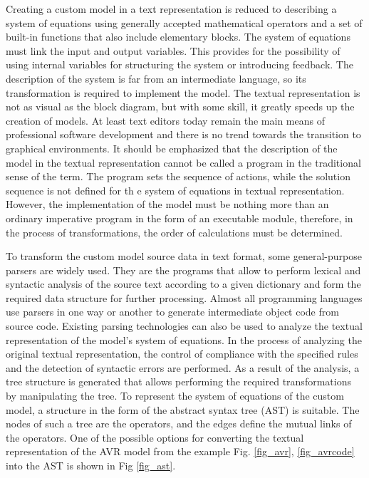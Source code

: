 \documentclass[lettersize,journal]{IEEEtran}
\begin{document}
Creating a custom model in a text representation is reduced to describing a system of equations using generally accepted
mathematical operators and a set of built-in functions that also include elementary blocks. The system of equations must 
link the input and output variables. This provides for the possibility of using internal variables for structuring the 
system or introducing feedback. The description of the system is far from an intermediate language, so its transformation 
is required to implement the model. The textual representation is not as visual as the block diagram, 
but with some skill, it greatly speeds up the creation of models. At least text editors today remain the main means 
of professional software development and there is no trend towards the transition to graphical environments. 
It should be emphasized that the description of the model in the textual representation cannot be called a program in the
traditional sense of the term. The program sets the sequence of actions, while the solution sequence is not defined for th
e system of equations in textual representation. However, the implementation of the model must be nothing more than an ordinary
imperative program in the form of an executable module, therefore, in the process of transformations, 
the order of calculations must be determined.

To transform the custom model source data in text format, some general-purpose parsers are widely used. They are the programs
that allow to perform lexical and syntactic analysis of the source text according to a given dictionary and form the required 
data structure for further processing. Almost all programming languages use parsers in one way or another to generate 
intermediate object code from source code. Existing parsing technologies can also be used to analyze the textual representation 
of the model's system of equations. In the process of analyzing the original textual representation, the control of compliance 
with the specified rules and the detection of syntactic errors are performed. As a result of the analysis, a tree structure is
generated that allows performing the required transformations by manipulating the tree. To represent the system of equations 
of the custom model, a structure in the form of the abstract syntax tree (AST) is suitable. The nodes of such a tree are the
operators, and the edges define the mutual links of the operators. One of the possible options for converting the textual
representation of the AVR model from the example Fig. \ref{fig_avr}, \ref{fig_avrcode} into the AST is shown in Fig \ref{fig_ast}.
\end{document}

